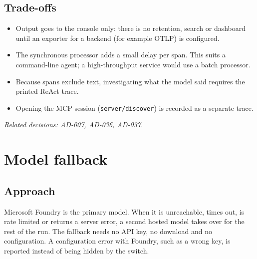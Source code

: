 \documentclass[11pt,letterpaper]{article}
\renewcommand{\_}{\textunderscore\allowbreak}
\begin{document}
\subsection*{Trade-offs}
\begin{itemize}
  \item Output goes to the console only: there is no retention, search or dashboard until an
  exporter for a backend (for example OTLP) is configured.
  \item The synchronous processor adds a small delay per span. This suits a command-line agent; a
  high-throughput service would use a batch processor.
  \item Because spans exclude text, investigating what the model said requires the printed ReAct
  trace.
  \item Opening the MCP session (\texttt{server/discover}) is recorded as a separate trace.
\end{itemize}

{\small\textit{Related decisions: AD-007, AD-036, AD-037.}}

\section{Model fallback}

\subsection*{Approach}
Microsoft Foundry is the primary model. When it is unreachable, times out, is rate limited or
returns a server error, a second hosted model takes over for the rest of the run. The fallback
needs no API key, no download and no configuration. A configuration error with Foundry, such as a
wrong key, is reported instead of being hidden by the switch.
\end{document}
